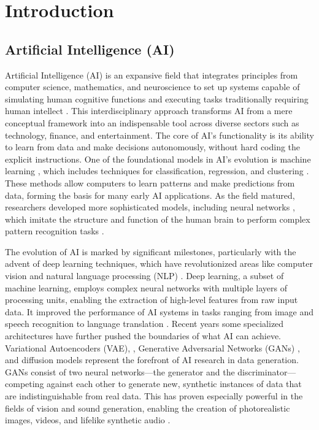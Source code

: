 \documentclass[11pt,a4paper,oneside]{report}
\begin{document}

\chapter{Introduction}
\label{introduction}

\section{Artificial Intelligence (AI)}
Artificial Intelligence (AI) is an expansive field that integrates principles from computer science, mathematics, and neuroscience to set up systems capable of simulating human cognitive functions and executing tasks traditionally requiring human intellect \cite{russell2010artificial}. 
This interdisciplinary approach transforms AI from a mere conceptual framework into an indispensable tool across diverse sectors such as technology, finance, and entertainment. 
The core of AI's functionality is its ability to learn from data and make decisions autonomously, without hard coding the explicit instructions. 
One of the foundational models in AI's evolution is machine learning \cite{jordan2015machine}, which includes techniques for classification, regression, and clustering \cite{huang2022large}. 
These methods allow computers to learn patterns and make predictions from data, forming the basis for many early AI applications. 
As the field matured, researchers developed more sophisticated models, including neural networks \cite{abiodun2018state}, which imitate the structure and function of the human brain to perform complex pattern recognition tasks \cite{schmidhuber2015deep}.

The evolution of AI is marked by significant milestones, particularly with the advent of deep learning \cite{lecun2015deep} techniques, which have revolutionized areas like computer vision \cite{voulodimos2018deep} and natural language processing (NLP) \cite{chowdhary2020natural}. 
Deep learning, a subset of machine learning, employs complex neural networks with multiple layers of processing units, enabling the extraction of high-level features from raw input data. 
It improved the performance of AI systems in tasks ranging from image and speech recognition to language translation \cite{goodfellow2016deep}.
Recent years some specialized architectures have further pushed the boundaries of what AI can achieve. 
Variational Autoencoders (VAE), \cite{rezende2014stochastic, kingma2013auto}, Generative Adversarial Networks (GANs) \cite{goodfellow2014generative, vondrick2016generating, tulyakov2018mocogan, clark2019adversarial, brooks2022generating}, and diffusion models \cite{rombach2022high, ho2022imagen, blattmann2023align, gupta2023photorealistic} represent the forefront of AI research in data generation. 
GANs consist of two neural networks—the generator and the discriminator—competing against each other to generate new, synthetic instances of data that are indistinguishable from real data. 
This has proven especially powerful in the fields of vision and sound generation, enabling the creation of photorealistic images, videos, and lifelike synthetic audio \cite{granot2022drop}.
\end{document}
